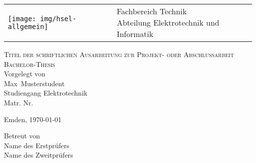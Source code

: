 \begin{titlepage}

\vspace{-0.5cm}
\hspace{-2.0cm}
\begin{tabular}{p{8.0cm} p{8.0cm}}
  \texttt{[image: img/hsel-allgemein]} &
   \parbox[b]{8.0cm}{
     {\large 	Fachbereich Technik }\\
     {\large 	Abteilung Elektrotechnik und Informatik }     
    } \\
   \\
   \hline
\end{tabular}
%
\begin{center}

\vspace{2.5cm}%
\LARGE{\textsc{ %
Titel der schriftlichen Ausarbeitung zur Projekt- oder Abschlussarbeit}}\\

\vspace{2.5cm}%
\LARGE{\textsc{%
{Bachelor-Thesis} %
}}\\

\vspace{2cm}%
\large
Vorgelegt von\\ Max~Musterstudent\\ Studiengang Elektrotechnik\\ Matr. Nr. 

\vspace{1cm} 
Emden, \today

\vspace{3.5cm}%
Betreut von\\ Name des Erstprüfers\\ Name des Zweitprüfers

\end{center}
\normalsize
\end{titlepage}

